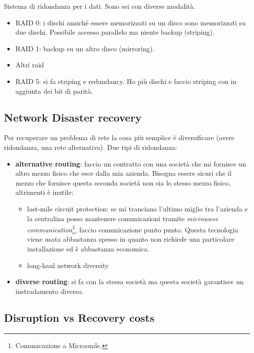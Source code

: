 Sistema di ridondanza per i dati. Sono sei con diverse modalità.
\begin{itemize}
  \item RAID 0: i dischi anziché essere memorizzati su un disco sono 
  memorizzati su due dischi. Possibile accesso parallelo ma niente backup 
  (striping).
  
  \item RAID 1: backup su un altro disco (mirroring).
  
  \item Altri raid
  
  \item RAID 5: si fa striping e redundancy. Ho più dischi e faccio striping 
  con in aggiunta dei bit di parità.
  
\end{itemize}

\subsection{Network Disaster recovery}

Per recuperare un problema di rete la cosa più semplice è diversificare (avere 
ridondanza, una rete alternativa). Due tipi di ridondanza:
\begin{itemize}
  \item \textbf{alternative routing}: faccio un contratto con una società che 
  mi fornisce un altro mezzo fisico che esce dalla mia azienda. Bisogna essere 
sicuri che il mezzo che fornisce questa seconda società non sia lo stesso mezzo 
fisico, altrimenti è inutile;
  \begin{itemize}
    \item last-mile circuit protection: se mi tranciano l'ultimo miglio tra 
l'azienda e la centralina posso mantenere comunicazioni tramite 
\textit{microwave communication}\footnote{Comunicazione a Microonde.}, faccio 
comunicazione punto punto. Questa tecnologia viene usata abbastanza spesso in 
quanto non richiede una particolare installazione ed è abbastanza economica.
    \item long-haul network diversity
  \end{itemize}
  \item \textbf{diverse routing}: si fa con la stessa società ma questa società 
garantisce un instradamento diverso.
\end{itemize}

\subsection{Disruption vs Recovery costs}

